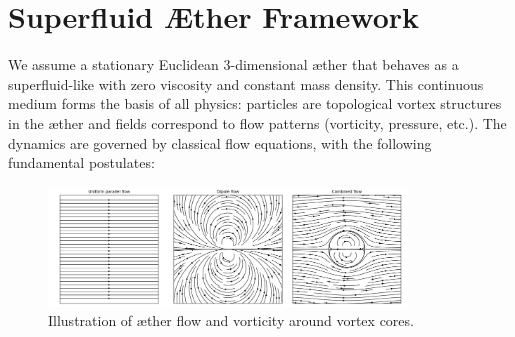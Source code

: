 
\section{Superfluid Æther Framework}

We assume a stationary Euclidean 3-dimensional æther that behaves as a superfluid-like with zero viscosity and constant mass density. This continuous medium forms the basis of all physics: particles are topological vortex structures in the æther and fields correspond to flow patterns (vorticity, pressure, etc.). The dynamics are governed by classical flow equations, with the following fundamental postulates:

\begin{figure}[htbp]
    \centering
    \includegraphics[width=0.85\textwidth]{03-combined_flow}
    \caption{Illustration of æther flow and vorticity around vortex cores.}
    \label{fig:vortexfields}
\end{figure}
